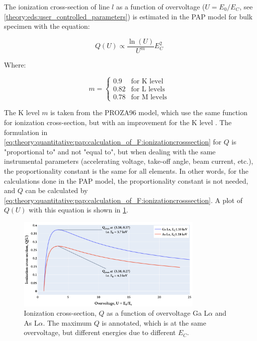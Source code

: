 The ionization cross-section of line $l$ as a function of overvoltage ($U = E_0/E_C$, see \cref{theory:eds:user_controlled_parameters}) is estimated in the PAP model for bulk specimen with the equation:

\begin{equation}
    \label{eq:theory:quantitative:pap:calculation_of_F:ionizationcrosssection}
    Q(U) \propto \frac{\ln(U)}{U^m} E_C^2
\end{equation}

Where:

\begin{equation}
    \label{eq:theory:quantitative:pap:calculation_of_F:ionizationcrosssection:m}
    m = \begin{cases}
        0.9  & \text{for K level}  \\
        0.82 & \text{for L levels} \\
        0.78 & \text{for M levels}
    \end{cases}
\end{equation}

The K level $m$ is taken from the PROZA96 model, which use the same function for ionization cross-section, but with an improvement for the K level \cite{bastin_proza96_1998}.
The formulation in \cref{eq:theory:quantitative:pap:calculation_of_F:ionizationcrosssection} for $Q$ is "proportional to" and not "equal to", but when dealing with the same instrumental parameters (accelerating voltage, take-off angle, beam current, etc.), the proportionality constant is the same for all elements.
In other words, for the calculations done in the PAP model, the proportionality constant is not needed, and $Q$ can be calculated by \cref{eq:theory:quantitative:pap:calculation_of_F:ionizationcrosssection}.
A plot of $Q(U)$ with this equation is shown in \cref{fig:PAP:ionization_cross_section}.



\begin{figure}[htbp]
    \centering
    \includegraphics[width=0.8\textwidth]{figures/PAP_ionization_cross_section.pdf}
    \caption{
        Ionization cross-section, $Q$ as a function of overvoltage Ga L$\alpha$ and As L$\alpha$.
        The maximum $Q$ is annotated, which is at the same overvoltage, but different energies due to different $E_C$.
    }
    \label{fig:PAP:ionization_cross_section}
\end{figure}




